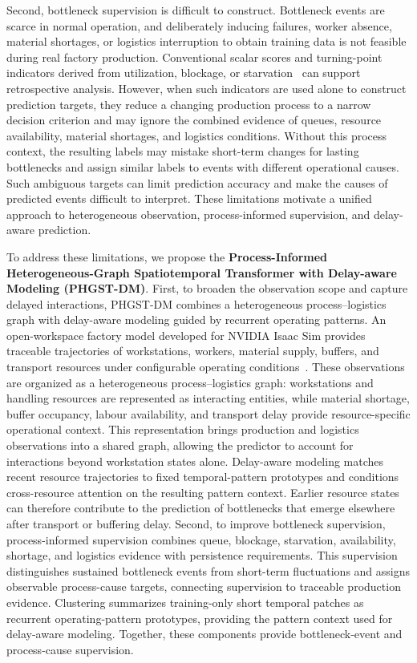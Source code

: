 \documentclass[a4paper,fleqn]{cas-dc}
\begin{document}
Second, bottleneck supervision is difficult to construct. Bottleneck events are scarce in normal operation, and deliberately inducing failures, worker absence, material shortages, or logistics interruption to obtain training data is not feasible during real factory production. Conventional scalar scores and turning-point indicators derived from utilization, blockage, or starvation~\cite{subramaniyan2023throughput,lai2021data,su2022dynamic} can support retrospective analysis. However, when such indicators are used alone to construct prediction targets, they reduce a changing production process to a narrow decision criterion and may ignore the combined evidence of queues, resource availability, material shortages, and logistics conditions. Without this process context, the resulting labels may mistake short-term changes for lasting bottlenecks and assign similar labels to events with different operational causes. Such ambiguous targets can limit prediction accuracy and make the causes of predicted events difficult to interpret. These limitations motivate a unified approach to heterogeneous observation, process-informed supervision, and delay-aware prediction.

To address these limitations, we propose the \textbf{Process-Informed Heterogeneous-Graph Spatiotemporal Transformer with Delay-aware Modeling (PHGST-DM)}. First, to broaden the observation scope and capture delayed interactions, PHGST-DM combines a heterogeneous process--logistics graph with delay-aware modeling guided by recurrent operating patterns. An open-workspace factory model developed for NVIDIA Isaac Sim provides traceable trajectories of workstations, workers, material supply, buffers, and transport resources under configurable operating conditions~\cite{lu2020digital,isaacsim2026,xue2026safe}. These observations are organized as a heterogeneous process--logistics graph: workstations and handling resources are represented as interacting entities, while material shortage, buffer occupancy, labour availability, and transport delay provide resource-specific operational context. This representation brings production and logistics observations into a shared graph, allowing the predictor to account for interactions beyond workstation states alone. Delay-aware modeling matches recent resource trajectories to fixed temporal-pattern prototypes and conditions cross-resource attention on the resulting pattern context. Earlier resource states can therefore contribute to the prediction of bottlenecks that emerge elsewhere after transport or buffering delay. Second, to improve bottleneck supervision, process-informed supervision combines queue, blockage, starvation, availability, shortage, and logistics evidence with persistence requirements. This supervision distinguishes sustained bottleneck events from short-term fluctuations and assigns observable process-cause targets, connecting supervision to traceable production evidence. Clustering summarizes training-only short temporal patches as recurrent operating-pattern prototypes, providing the pattern context used for delay-aware modeling. Together, these components provide bottleneck-event and process-cause supervision.
\end{document}
